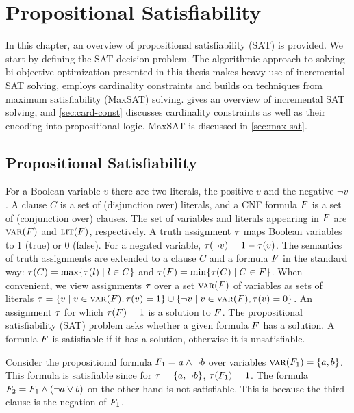\chapter{Propositional Satisfiability\label{chap:satisfiability}}

In this chapter, an overview of propositional satisfiability (SAT) is provided.
We start by defining the SAT decision problem.
The algorithmic approach to solving bi-objective optimization presented in this thesis makes heavy use of incremental SAT solving, employs cardinality constraints and builds on techniques from maximum satisfiability (MaxSAT) solving.
 gives an overview of incremental SAT solving, and \cref{sec:card-const} discusses cardinality constraints as well as their encoding into propositional logic.
MaxSAT is discussed in \cref{sec:max-sat}.

\section{Propositional Satisfiability\label{sec:sat}}

For a Boolean variable $v$ there are two literals, the positive $v$ and the negative $\lnot v$. 
A clause $C$ is a set of (disjunction over) literals, and a CNF formula $F$ is a set of (conjunction over) clauses.
The set of variables and literals appearing in $F$ are $\textsc{var}(F)$ and $\textsc{lit}(F)$, respectively.  
A truth assignment $\tau$ maps Boolean variables to 1 (true) or 0 (false).
For a negated variable, $\tau(\neg v) = 1 - \tau(v)$.
The semantics of truth assignments are extended to a clause $C$ and a formula $F$ in the standard way: $\tau(C) = \max\{ \tau(l) \mid l \in C\}$ and $\tau(F) = \min\{\tau(C) \mid C \in F\}$.
When convenient, we view assignments $\tau$ over a set $\textsc{var}(F)$ of variables as sets of literals $\tau = \{ v \mid v \in \textsc{var}(F),  \tau(v) = 1\} \cup \{ \lnot v \mid v \in \textsc{var}(F), \tau(v) = 0\}$.
An assignment $\tau$ for which $\tau(F) = 1$ is a solution to $F$.
The propositional satisfiability (SAT) problem asks whether a given formula $F$ has a solution.
A formula $F$ is satisfiable if it has a solution, otherwise it is unsatisfiable.

\begin{example}
  Consider the propositional formula $F_1 = a \land \lnot b$ over variables $\textsc{var}(F_1) = \{a,b\}$.
  This formula is satisfiable since for $\tau=\{a,\lnot b\}$, $\tau(F_1)=1$.
  The formula $F_2 = F_1 \land (\lnot a \lor b)$ on the other hand is not satisfiable.
  This is because the third clause is the negation of $F_1$.
\end{example}

